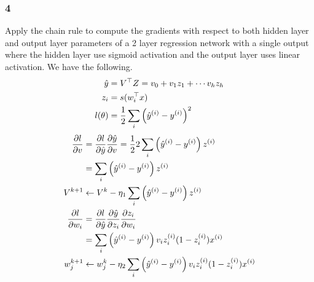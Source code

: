 \documentclass{article}
\begin{document}
\subsubsection*{4}
\begin{myleftlinebox}
    Apply the chain rule to compute the gradients with respect to both hidden layer and output layer parameters of a 2 layer regression network with a single output where the hidden layer use sigmoid activation and the output layer uses linear activation.
    \tcbline
    We have the following. 
    \begin{equation*}
        \begin{split}
            \hat y &= V^\top Z = v_0+v_1 z_1 +\cdots v_h z_h\\
            z_i &= s(w_i^\top x)\\
            l(\theta) &= \frac{1}{2}\sum_i \left( \hat y^{(i)}-y^{(i)} \right)^2\\
        \end{split}    
    \end{equation*}
    \begin{equation*}
        \begin{split}
            \frac{\partial l}{\partial v} &= \frac{\partial l}{\partial \hat y}\frac{\partial \hat y}{\partial v} = \frac{1}{2} 2 \sum_i \left( \hat y^{(i)}-y^{(i)} \right) z^{(i)}\\
            &= \sum_i \left( \hat y^{(i)}-y^{(i)} \right)z^{(i)}\\
            V^{k+1} &\gets V^{k}-\eta_1  \sum_i \left( \hat y^{(i)}-y^{(i)} \right)z^{(i)}\\
            \frac{\partial l}{\partial w_i} &= \frac{\partial l}{\partial \hat y}\frac{\partial\hat y}{\partial z_i}\frac{\partial z_i}{\partial w_i}\\
            &=\sum_i  \left( \hat y^{(i)}-y^{(i)} \right) v_i z^{(i)}_i(1-z^{(i)}_i)x^{(i)}\\
            w_j^{k+1} &\gets w_j^k-\eta_2  \sum_i  \left( \hat y^{(i)}-y^{(i)} \right) v_i z^{(i)}_i(1-z^{(i)}_i)x^{(i)}
        \end{split}
    \end{equation*}
\end{myleftlinebox}
\end{document}
